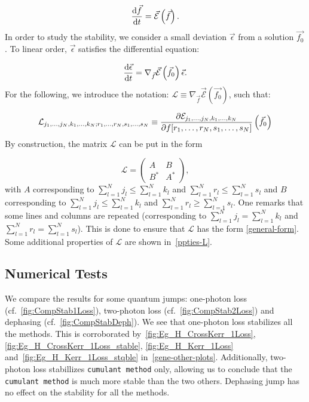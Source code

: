 \begin{equation}
    \dv{\Vec{f}}{t} = \Vec{\mathcal{E}}\left(\Vec{f}\right).
\end{equation}
In order to study the stability, we consider a small deviation $\Vec{\epsilon}$ from a solution $\Vec{f_0}$. To linear order, $\Vec{\epsilon}$ satisfies the differential equation:

\begin{equation}
    \dv{\Vec{\epsilon}}{t} = \nabla_{\Vec{f}} \Vec{\mathcal{E}}\left(\Vec{f_0}\right) \Vec{\epsilon}.
\end{equation}
For the following, we introduce the notation: $\mathcal{L} \equiv \nabla_{\Vec{f}} \Vec{\mathcal{E}}\left(\Vec{f_0}\right)$, such that:

\begin{equation}
    \mathcal{L}_{j_1, \ldots, j_N , k_1, \ldots, k_N; r_1, \ldots, r_N, s_1, \ldots, s_N} \equiv \pdv{\mathcal{E}_{j_1, \ldots, j_N, k_1, \ldots, k_N}}{{f[r_1, \ldots, r_N, s_1, \ldots, s_N]}}\left(\Vec{f_0}\right)
\end{equation}
By construction, the matrix $\mathcal{L}$ can be put in the form

\begin{equation} \label{general-form}
    \mathcal{L} = \begin{pmatrix}
        A & B\\
        B^* & A^*
    \end{pmatrix},
\end{equation}
with $A$ corresponding to $\sum_{l = 1}^N j_l \le \sum_{l = 1}^N k_l$ and $\sum_{l = 1}^N r_l \le \sum_{l = 1}^N s_l$ and $B$ corresponding to $\sum_{l = 1}^N j_l \le \sum_{l = 1}^N k_l$ and $\sum_{l = 1}^N r_l \ge \sum_{l = 1}^N s_l$. One remarks that some lines and columns are repeated (corresponding to $\sum_{l = 1}^N j_l = \sum_{l = 1}^N k_l$ and $\sum_{l = 1}^N r_l = \sum_{l = 1}^N s_l$). This is done to ensure that $\mathcal{L}$ has the form \ref{general-form}. Some additional properties of $\mathcal{L}$ are shown in~\autoref{ppties-L}.

\subsection{Numerical Tests} \label{sub-num-stab}

We compare the results for some quantum jumps: one-photon loss (cf.\@~\autoref{fig:CompStab1Loss}), two-photon loss (cf.\@~\autoref{fig:CompStab2Loss}) and dephasing (cf.\@~\autoref{fig:CompStabDeph}). We see that one-photon loss stabilizes all the methods. This is corroborated by~\autoref{fig:Eg_H_CrossKerr_1Loss}, \autoref{fig:Eg_H_CrossKerr_1Loss_stable}, \autoref{fig:Eg_H_Kerr_1Loss} and~\autoref{fig:Eg_H_Kerr_1Loss_stqble} in~\autoref{gene-other-plots}. Additionally, two-photon loss stabillizes \texttt{cumulant method} only, allowing us to conclude that the \texttt{cumulant method} is much more stable than the two others. Dephasing jump has no effect on the stability for all the methods.


